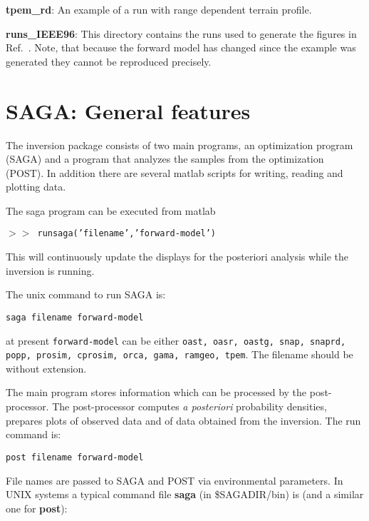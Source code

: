 \documentclass{saclantc}
\begin{document}
\noindent
{\bf tpem\_rd}: An example of a run with  range dependent terrain profile.

\noindent
{\bf runs\_IEEE96}: This directory contains the runs  used to generate the
figures in Ref.\ \cite{gingras:ieee97}. Note, that because the forward
model has changed since the example was generated they cannot be
reproduced precisely.


\section{SAGA: General features}

The inversion package consists of two main programs, an optimization
program ({\sf SAGA}) and a program that analyzes the samples from the
optimization ({\sf POST}). In addition there are several matlab scripts
for writing, reading and plotting data.

The saga program can be executed    from matlab 

{\tt $ > >$ runsaga('filename','forward-model')}

This will continuously update the displays for the posteriori analysis
while the inversion is running.

The unix command to run {\sf SAGA} is:

{\tt saga filename  forward-model}

at present {\tt  forward-model}
can be either {\tt oast, oasr, oastg, snap, snaprd, popp, prosim,
cprosim, orca, gama, ramgeo, tpem}.
The filename should be without extension.

The main program stores information which can be processed by the 
post-processor.  The post-processor computes {\em a posteriori}
 probability densities, 
prepares plots of observed data and of data obtained from the inversion. 
The run command is:

{\tt post filename forward-model}


File names  are  passed  to   {\sf SAGA} and {\sf POST}   via 
environmental parameters. In UNIX systems a typical command  file 
{\bf saga} (in  \$SAGADIR/bin) is (and a similar one for {\bf post}):
\end{document}
